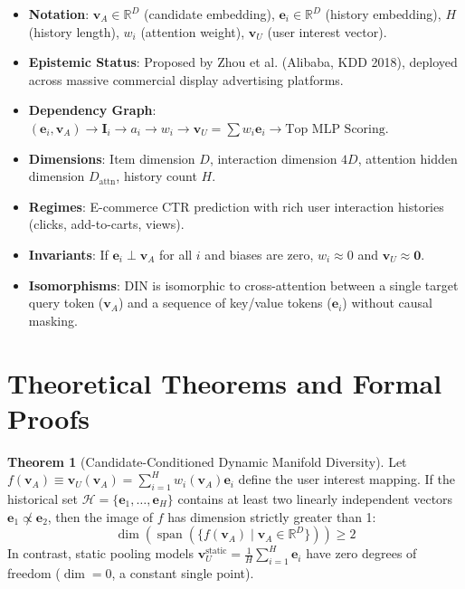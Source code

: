 \documentclass[11pt,a4paper]{article}
\theoremstyle{definition}
\newtheorem{theorem}{\textbf{Theorem}}[section]
\begin{document}
\begin{itemize}
    \item \textbf{Notation}: $\mathbf{v}_A \in \mathbb{R}^D$ (candidate embedding), $\mathbf{e}_i \in \mathbb{R}^D$ (history embedding), $H$ (history length), $w_i$ (attention weight), $\mathbf{v}_U$ (user interest vector).
    \item \textbf{Epistemic Status}: Proposed by Zhou et al. (Alibaba, KDD 2018), deployed across massive commercial display advertising platforms.
    \item \textbf{Dependency Graph}: $(\mathbf{e}_i, \mathbf{v}_A) \to \mathbf{I}_i \to a_i \to w_i \to \mathbf{v}_U = \sum w_i \mathbf{e}_i \to \text{Top MLP Scoring}$.
    \item \textbf{Dimensions}: Item dimension $D$, interaction dimension $4D$, attention hidden dimension $D_{\text{attn}}$, history count $H$.
    \item \textbf{Regimes}: E-commerce CTR prediction with rich user interaction histories (clicks, add-to-carts, views).
    \item \textbf{Invariants}: If $\mathbf{e}_i \perp \mathbf{v}_A$ for all $i$ and biases are zero, $w_i \approx 0$ and $\mathbf{v}_U \approx \mathbf{0}$.
    \item \textbf{Isomorphisms}: DIN is isomorphic to cross-attention between a single target query token ($\mathbf{v}_A$) and a sequence of key/value tokens ($\mathbf{e}_i$) without causal masking.
\end{itemize}

\section{Theoretical Theorems and Formal Proofs}

\begin{theorem}[Candidate-Conditioned Dynamic Manifold Diversity]
Let $f(\mathbf{v}_A) \equiv \mathbf{v}_U(\mathbf{v}_A) = \sum_{i=1}^H w_i(\mathbf{v}_A) \mathbf{e}_i$ define the user interest mapping. If the historical set $\mathcal{H} = \{\mathbf{e}_1, \dots, \mathbf{e}_H\}$ contains at least two linearly independent vectors $\mathbf{e}_1 \not\propto \mathbf{e}_2$, then the image of $f$ has dimension strictly greater than 1:
{\boldmath
\begin{equation}
\dim\left( \operatorname{span}\left( \{ f(\mathbf{v}_A) \mid \mathbf{v}_A \in \mathbb{R}^D \} \right) \right) \ge 2
\end{equation}
}
In contrast, static pooling models $\mathbf{v}_U^{\text{static}} = \frac{1}{H}\sum_{i=1}^H \mathbf{e}_i$ have zero degrees of freedom ($\dim = 0$, a constant single point).
\end{theorem}
\end{document}
